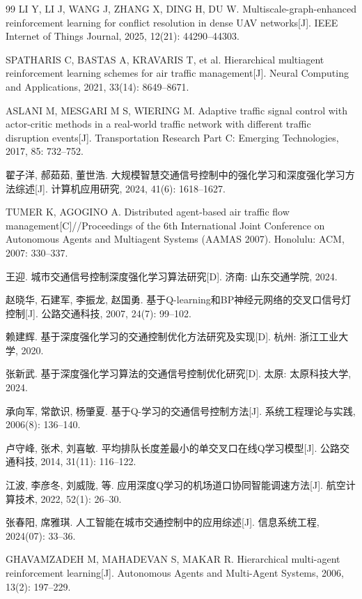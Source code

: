 \documentclass[12pt,a4paper,UTF8]{ctexart}
\begin{document}
\begin{thebibliography}{99}
 LI Y, LI J, WANG J, ZHANG X, DING H, DU W. Multiscale-graph-enhanced reinforcement learning for conflict resolution in dense UAV networks[J]. IEEE Internet of Things Journal, 2025, 12(21): 44290--44303.

 SPATHARIS C, BASTAS A, KRAVARIS T, et al. Hierarchical multiagent reinforcement learning schemes for air traffic management[J]. Neural Computing and Applications, 2021, 33(14): 8649--8671.

 ASLANI M, MESGARI M S, WIERING M. Adaptive traffic signal control with actor-critic methods in a real-world traffic network with different traffic disruption events[J]. Transportation Research Part C: Emerging Technologies, 2017, 85: 732--752.

 翟子洋, 郝茹茹, 董世浩. 大规模智慧交通信号控制中的强化学习和深度强化学习方法综述[J]. 计算机应用研究, 2024, 41(6): 1618--1627.

 TUMER K, AGOGINO A. Distributed agent-based air traffic flow management[C]//Proceedings of the 6th International Joint Conference on Autonomous Agents and Multiagent Systems (AAMAS 2007). Honolulu: ACM, 2007: 330--337.

 王迎. 城市交通信号控制深度强化学习算法研究[D]. 济南: 山东交通学院, 2024.

 赵晓华, 石建军, 李振龙, 赵国勇. 基于Q-learning和BP神经元网络的交叉口信号灯控制[J]. 公路交通科技, 2007, 24(7): 99--102.

 赖建辉. 基于深度强化学习的交通控制优化方法研究及实现[D]. 杭州: 浙江工业大学, 2020.

 张新武. 基于深度强化学习算法的交通信号控制优化研究[D]. 太原: 太原科技大学, 2024.

 承向军, 常歆识, 杨肇夏. 基于Q-学习的交通信号控制方法[J]. 系统工程理论与实践, 2006(8): 136--140.

 卢守峰, 张术, 刘喜敏. 平均排队长度差最小的单交叉口在线Q学习模型[J]. 公路交通科技, 2014, 31(11): 116--122.

 江波, 李彦冬, 刘威陇, 等. 应用深度Q学习的机场道口协同智能调速方法[J]. 航空计算技术, 2022, 52(1): 26--30.

 张春阳, 席雅琪. 人工智能在城市交通控制中的应用综述[J]. 信息系统工程, 2024(07): 33--36.

 GHAVAMZADEH M, MAHADEVAN S, MAKAR R. Hierarchical multi-agent reinforcement learning[J]. Autonomous Agents and Multi-Agent Systems, 2006, 13(2): 197--229.


\end{thebibliography}
\end{document}
